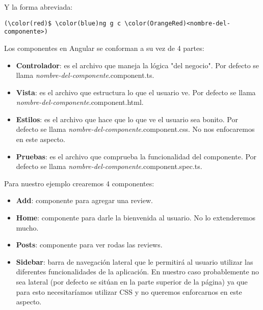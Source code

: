 \documentclass{article}
\begin{document}
Y la forma abreviada:

\begin{Verbatim}[fontsize=\small,commandchars=\\\(\)]
    (\color(red)$ \color(blue)ng g c \color(OrangeRed)<nombre-del-componente>)
\end{Verbatim}

Los componentes en Angular se conforman a su vez de 4 partes:

\begin{itemize}
    \item \textbf{Controlador}: es el archivo que maneja la l\'ogica "del negocio". Por defecto se llama \textit{nombre-del-componente}.component.ts.
    
    \item \textbf{Vista}: es el archivo que estructura lo que el usuario ve. Por defecto se llama \textit{nombre-del-componente}.component.html.
    
    \item \textbf{Estilos}: es el archivo que hace que lo que ve el usuario sea bonito. Por defecto se llama \textit{nombre-del-componente}.component.css. No nos enfocaremos en este aspecto.
    
    \item \textbf{Pruebas}: es el archivo que comprueba la funcionalidad del componente. Por defecto se llama \textit{nombre-del-componente}.component.spec.ts.
\end{itemize}

Para nuestro ejemplo crearemos 4 componentes:

\begin{itemize}
    \item \textbf{Add}: componente para agregar una review.
    
    \item \textbf{Home}: componente para darle la bienvenida al usuario. No lo extenderemos mucho.
    
    \item \textbf{Posts}: componente para ver rodas las reviews.
    
    \item \textbf{Sidebar}: barra de navegaci\'on lateral que le permitir\'a al usuario utilizar las diferentes funcionalidades de la aplicaci\'on. En nuestro caso probablemente no sea lateral (por defecto se sit\'uan en la parte superior de la p\'agina) ya que para esto necesitar\'iamos utilizar CSS y no queremos enforcarnos en este aspecto.
\end{itemize}
\end{document}
